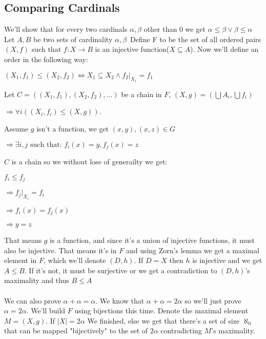 \documentclass{article}
\begin{document}
\subsection{Comparing Cardinals}
We'll show that for every two cardinals $\alpha,\beta$ other than 0 we get $\alpha\le\beta\lor\beta\le\alpha$\\
Let $A,B$ be two sets of cardinality $\alpha,\beta$\
Define F to be the set of all ordered pairs $(X,f)$ such that $f:X\rightarrow B$ is an injective function($X\subseteq A$).
Now we'll define an order in the following way:
\begin{center}$(X_1,f_1)\le(X_2,f_2)\iff X_1\subseteq X_2 \land f_2|_{X_1}=f_1$\end{center}
Let $C=((X_1,f_1),(X_2,f_2),\ldots)$ be a chain in $F$, $(X,g)=(\bigcup A_{i},\bigcup f_i)$
\begin{center}$ \Rightarrow \forall i((X_i,f_i)\le(X,g))$.\end{center}
Assume $g$ isn't a function, we get $(x,y),(x,z)\in G$
\begin{center}$\Rightarrow \exists i,j \text{ such that: } f_i(x)=y,f_j(x)=z$\end{center}
$C$ is a chain so we without lose of generailty we get:
\begin{center}$f_i\le f_j$\end{center}
\begin{center}$\Rightarrow f_j|_{X_i}=f_i$\end{center}
\begin{center}$\Rightarrow f_i(x)=f_j(x)$\end{center}
\begin{center}$\Rightarrow y=z$\end{center}
That means $g$ is a function, and since it's a union of injective functions, it must also be injective. That means it's in $F$ and using Zorn's lemma we get a maximal element in $F$, which we'll denote $(D,h)$. If $D=X$ then $h$ is injective and we get $A\le B$. If it's not, it must be surjective or we get a contradiction to $(D,h)$'s maximality and thus $B\le A$
\\\\
We can also prove $\alpha+\alpha=\alpha$. We know that $\alpha+\alpha=2\alpha$ so we'll just prove $\alpha=2\alpha$. We'll build $F$ using bijections this time. Denote the maximal element $M=(X,g)$. If $|X|=2\alpha$ We finished, else we get that there's a set of size $\aleph_0$ that can be mapped "bijectively" to the set of $2\alpha$ contradicting $M$'s maximality.
\end{document}
